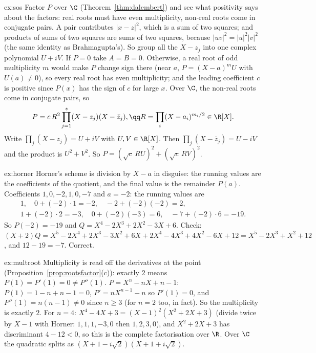 \begin{solution}{ex:sos}
\idea Factor $P$ over $\C$ (Theorem~\ref{thm:dalembert}) and see what positivity says about the factors: real roots must have even multiplicity, non-real roots come in conjugate pairs. A pair contributes $|x-z|^2$, which is a sum of two squares; and products of sums of two squares are sums of two squares, because $|uv|^2=|u|^2|v|^2$ (the same identity as Brahmagupta's). So group all the $X-z_j$ into one complex polynomial $U+iV$.
\writeup If $P=0$ take $A=B=0$. Otherwise, a real root of odd multiplicity $m$ would make $P$ change sign there (near $a$, $P=(X-a)^mU$ with $U(a)\ne0$), so every real root has even multiplicity;
and the leading coefficient $c$ is positive since $P(x)$ has the sign of $c$ for large $x$. Over $\C$, the non-real roots come in conjugate pairs, so
\[
\begin{gathered}P=c\,R^2\prod_{j=1}^s(X-z_j)(X-\bar z_j),\qq R=\prod_i(X-a_i)^{m_i/2}\in\R[X].\end{gathered}
\]
Write $\prod_j(X-z_j)=U+iV$ with $U,V\in\R[X]$. Then $\prod_j(X-\bar z_j)=U-iV$ and the product is $U^2+V^2$.
So $P=(\sqrt c\,RU)^2+(\sqrt c\,RV)^2$.
\end{solution}

\begin{solution}{ex:horner}
\idea Horner's scheme is division by $X-a$ in disguise: the running values are the coefficients of the quotient, and the final value is the remainder $P(a)$.
\writeup Coefficients $1,0,-2,1,0,-7$ and $a=-2$: the running values are
\[
\begin{gathered}1,\quad 0+(-2)\cdot1=-2,\quad -2+(-2)(-2)=2,\\ 1+(-2)\cdot2=-3,\quad 0+(-2)(-3)=6,\quad -7+(-2)\cdot6=-19.\end{gathered}
\]
So $P(-2)=-19$ and $Q=X^4-2X^3+2X^2-3X+6$. Check: $(X+2)Q=X^5-2X^4+2X^3-3X^2+6X+2X^4-4X^3+4X^2-6X+12=X^5-2X^3+X^2+12$, and $12-19=-7$. Correct.
\end{solution}

\begin{solution}{ex:multroot}
\idea Multiplicity is read off the derivatives at the point (Proposition~\ref{prop:rootsfactor}(c)): exactly $2$ means $P(1)=P'(1)=0\ne P''(1)$.
\writeup $P=X^n-nX+n-1$: $P(1)=1-n+n-1=0$, $P'=nX^{n-1}-n$ so $P'(1)=0$, and $P''(1)=n(n-1)\ne0$ since $n\ge3$ (for $n=2$ too, in fact). So the multiplicity is exactly $2$.
For $n=4$: $X^4-4X+3=(X-1)^2(X^2+2X+3)$ (divide twice by $X-1$ with Horner: $1,1,1,-3,0$ then $1,2,3,0$), and $X^2+2X+3$ has discriminant $4-12<0$, so this is the complete factorisation over $\R$. Over $\C$ the quadratic splits as $(X+1-i\sqrt2)(X+1+i\sqrt2)$.
\end{solution}

